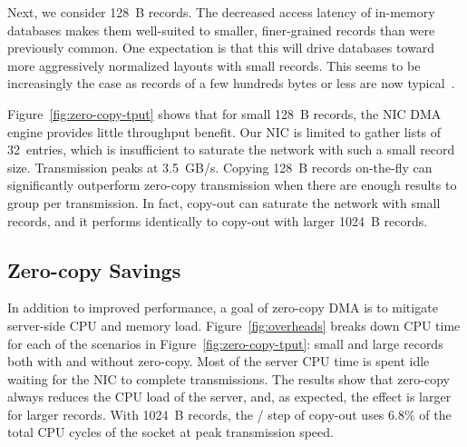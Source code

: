 
Next, we consider 128~B records. The decreased access latency of
in-memory databases makes them well-suited to smaller, finer-grained records
than were previously common. One expectation is that this will drive databases
toward more aggressively normalized layouts with small records. This
seems to be increasingly the case as records of a few hundreds bytes or less
are now typical~\cite{fb-memcache,fb-workload}.

Figure~\ref{fig:zero-copy-tput} shows that for small 128~B records, the NIC DMA
engine provides little throughput benefit. Our NIC is limited to gather lists
of 32~entries, which is insufficient to saturate the network with such a small
record size. Transmission peaks at 3.5~GB/s.
Copying 128~B records on-the-fly can significantly outperform
zero-copy transmission when there are enough results to group per transmission.
In fact, copy-out can saturate the network with small records, and it
performs identically to copy-out with larger 1024~B records.

\subsection{Zero-copy Savings}
\label{sec:overhead}


In addition to improved performance, a goal of zero-copy DMA is to mitigate
server-side CPU and memory load. Figure~\ref{fig:overheads} breaks down
CPU time for each of the scenarios in Figure~\ref{fig:zero-copy-tput}: small
and large records both with and without zero-copy. Most of the server
CPU time is spent idle waiting for the NIC to complete transmissions.  The
results show that zero-copy always reduces the CPU load of the server, and,
as expected, the effect is larger for larger records. With 1024~B records,
the \memcpy/  step of copy-out uses 6.8\% of the total CPU cycles of the
socket at peak transmission speed.

